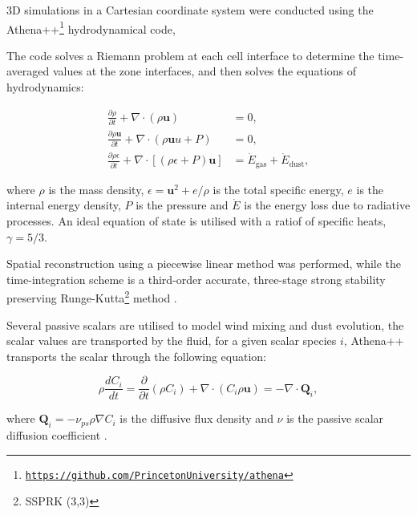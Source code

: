 3D simulations in a Cartesian coordinate system were conducted using the Athena++\footnote{\texttt{\href{https://github.com/PrincetonUniversity/athena}{https://github.com/PrincetonUniversity/athena}}} hydrodynamical code, 

The code solves a Riemann problem at each cell interface to determine the time-averaged values at the zone interfaces, and then solves the equations of hydrodynamics:

\begin{subequations}
  \begin{align}
    \frac{\partial \rho}{\partial t} + \nabla \cdot \left( \rho \mathbf{u} \right) & = 0, \\
    \frac{\partial \rho \mathbf{u}}{\partial t} + \nabla \cdot \left(\rho \mathbf{u} u + P \right) & = 0 , \\
    \frac{\partial \rho \epsilon}{\partial t} + \nabla \cdot \left[\left( \rho \epsilon + P \right) \mathbf{u} \right] & = \dot E_\text{gas} + \dot E_\text{dust} ,
  \end{align}
\end{subequations}

where $\rho$ is the mass density, $\epsilon = \mathbf{u}^2 + e/\rho$ is the total specific energy, $e$ is the internal energy density, $P$ is the pressure and $\dot E$ is the energy loss due to radiative processes. An ideal equation of state is utilised with a ratiof of specific heats, $\gamma = 5/3$.

Spatial reconstruction using a piecewise linear method was performed, while the time-integration scheme is a third-order accurate, three-stage strong stability preserving Runge-Kutta\footnote{SSPRK (3,3)} method \parencite{gottliebHighOrderStrong2009}.

Several passive scalars are utilised to model wind mixing and dust evolution, the scalar values are transported by the fluid, for a given scalar species $i$, Athena++ transports the scalar through the following equation:

\begin{equation}
  \rho \frac{dC_i}{dt} = \frac{\partial}{\partial t} \left( \rho C_i \right) + \nabla \cdot \left( C_i \rho \mathbf{u} \right) = -\nabla \cdot \mathbf{Q}_i ,  
\end{equation}

where $\mathbf{Q}_i = - \nu_{ps} \rho \nabla C_i$ is the diffusive flux density and $\nu$ is the passive scalar diffusion coefficient \parencite{stoneAthenaAdaptiveMesh2020}.

